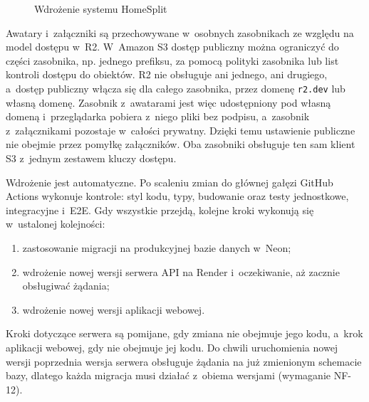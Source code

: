 \begin{figure}[H]
{%
  }
  \caption{Wdrożenie systemu HomeSplit}
  \label{fig:wdrozenie}
\end{figure}

Awatary i~załączniki są przechowywane w~osobnych zasobnikach ze względu na model dostępu w~R2. W~Amazon S3 dostęp publiczny można ograniczyć do części zasobnika, np. jednego prefiksu, za pomocą polityki zasobnika lub list kontroli dostępu do obiektów. R2 nie obsługuje ani jednego, ani drugiego, a~dostęp publiczny włącza się dla całego zasobnika, przez domenę \texttt{r2.dev} lub własną domenę. Zasobnik z~awatarami jest więc udostępniony pod własną domeną i~przeglądarka pobiera z~niego pliki bez podpisu, a~zasobnik z~załącznikami pozostaje w~całości prywatny. Dzięki temu ustawienie publiczne nie obejmie przez pomyłkę załączników. Oba zasobniki obsługuje ten sam klient S3 z~jednym zestawem kluczy dostępu.

Wdrożenie jest automatyczne. Po scaleniu zmian do głównej gałęzi GitHub Actions wykonuje kontrole: styl kodu, typy, budowanie oraz testy jednostkowe, integracyjne i~E2E. Gdy wszystkie przejdą, kolejne kroki wykonują się w~ustalonej kolejności:

\begin{enumerate}
  \item zastosowanie migracji na produkcyjnej bazie danych w~Neon;
  \item wdrożenie nowej wersji serwera API na Render i~oczekiwanie, aż zacznie obsługiwać żądania;
  \item wdrożenie nowej wersji aplikacji webowej.
\end{enumerate}

Kroki dotyczące serwera są pomijane, gdy zmiana nie obejmuje jego kodu, a~krok aplikacji webowej, gdy nie obejmuje jej kodu. Do chwili uruchomienia nowej wersji poprzednia wersja serwera obsługuje żądania na już zmienionym schemacie bazy, dlatego każda migracja musi działać z~obiema wersjami (wymaganie NF-12).

